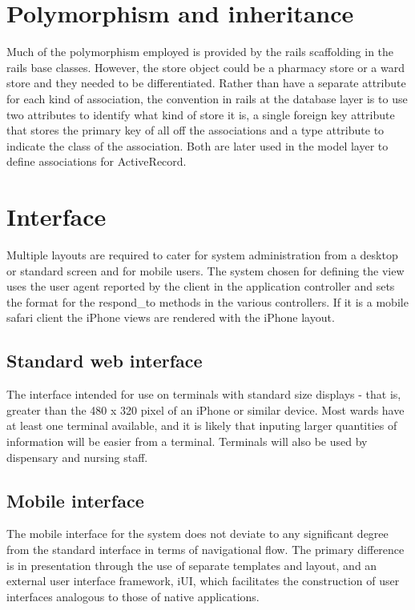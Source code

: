 \documentclass[letterpaper]{amsart}
\begin{document}
\section{Polymorphism and inheritance}
Much of the polymorphism employed is provided by the rails scaffolding in the rails base classes.  However, the store object could be a pharmacy store or a ward store and they needed to be differentiated.  Rather than have a separate attribute for each kind of association, the convention in rails at the database layer is to use two attributes to identify what kind of store it is, a single foreign key attribute that stores the primary key of all off the associations and a type attribute to indicate the class of the association.  Both are later used in the model layer to define associations for ActiveRecord.


\section{Interface}
Multiple layouts are required to cater for system administration from a desktop or standard screen and for mobile users.  The system chosen for defining the view uses the user agent reported by the client in the application controller and sets the format for the respond\_to methods in the various controllers.  If it is a mobile safari client the iPhone views are rendered with the iPhone layout.  
\subsection{Standard web interface}
The interface intended for use on terminals with standard size displays - that is, greater than the 480 x 320 pixel\cite{iphonespecs} of an iPhone or similar device. Most wards have at least one terminal available, and it is likely that inputing larger quantities of information will be easier from a terminal.  Terminals will also be used by dispensary and nursing staff.
\subsection{Mobile interface}
The mobile interface for the system does not deviate to any significant degree from the standard interface in terms of navigational flow.  The primary difference is in presentation through the use of separate templates and layout, and an external user interface framework, iUI\cite{iui}, which facilitates the construction of user interfaces analogous to those of native applications.
\end{document}

